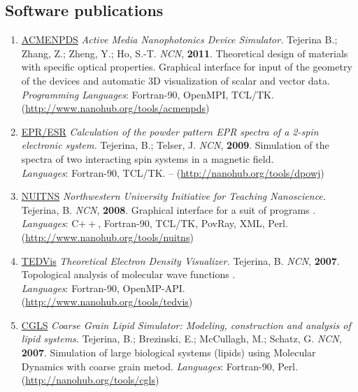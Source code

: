 \documentclass{article}
\begin{document}
\subsection*{Software publications}
\begin{enumerate}

\item \href{http://nanohub.org/tools/acmenpds}{ACMENPDS} \emph{Active Media Nanophotonics Device Simulator.} Tejerina B.; Zhang, Z.; Zheng, Y.; Ho, S.-T. \emph{NCN}, {\bf 2011}. Theoretical design of materials with specific optical properties. Graphical interface for input of the geometry of the devices and automatic 3D visualization of scalar and vector data.\\
\emph{Programming Languages}: Fortran-90, OpenMPI, TCL/TK.\\ (\href{http://www.nanohub.org/tools/acmenpds}{http://www.nanohub.org/tools/acmenpds})

\item \href{http://nanohub.org/tools/dpowj} {EPR/ESR} \emph{Calculation of the powder pattern EPR spectra of a 2-spin electronic system.} Tejerina, B.; Telser, J. \emph{NCN}, {\bf 2009}.  Simulation of the spectra of two interacting spin systems in a magnetic field.\\
\emph{Languages}: Fortran-90, TCL/TK.  -- (\href{http://nanohub.org/tools/dpowj}{http://nanohub.org/tools/dpowj})

\item \href{http://www.nanohub.org/tools/nuitns}{NUITNS} \emph{Northwestern University Initiative for Teaching Nanoscience.} Tejerina, B. \emph{NCN}, {\bf 2008}. Graphical interface for a suit of programs .\\
\emph{Languages}: C$++$, Fortran-90, TCL/TK, PovRay, XML, Perl.\\ (\href{http://www.nanohub.org/tools/nuitns}{http://www.nanohub.org/tools/nuitns})


\item \href{http://www.nanohub.org/tools/tedvis}{TEDVis} \emph{Theoretical Electron Density Visualizer.} Tejerina, B. \emph{NCN}, {\bf 2007}.  Topological analysis of molecular wave functions .\\
\emph{Languages}: Fortran-90, OpenMP-API. \\ (\href{http://www.nanohub.org/tools/tedvis}{http://www.nanohub.org/tools/tedvis})

\item \href{http://nanohub.org/tools/cgls} {CGLS} \emph{Coarse Grain Lipid Simulator: Modeling, construction and analysis of lipid systems.} Tejerina, B.; Brezinski, E.; McCullagh, M.; Schatz, G. \emph{NCN}, {\bf 2007}. Simulation of large biological systems (lipids) using Molecular Dynamics with coarse grain metod. \emph{Languages}: Fortran-90, Perl. \\ (\href{http://nanohub.org/tools/cgls}{http://nanohub.org/tools/cgls})

\end{enumerate}

\end{document}
